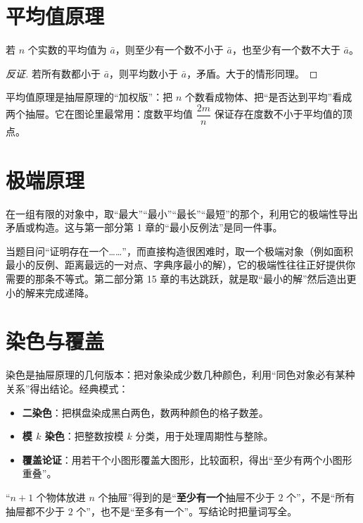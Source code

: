 \section{平均值原理}
\begin{theorem}[平均值原理]
若 $n$ 个实数的平均值为 $\bar a$，则至少有一个数不小于 $\bar a$，也至少有一个数不大于 $\bar a$。
\end{theorem}
\begin{proof}[反证]
若所有数都小于 $\bar a$，则平均数小于 $\bar a$，矛盾。大于的情形同理。
\end{proof}
平均值原理是抽屉原理的“加权版”：把 $n$ 个数看成物体、把“是否达到平均”看成两个抽屉。它在图论里最常用：度数平均值 $\dfrac{2m}{n}$ 保证存在度数不小于平均值的顶点。

\section{极端原理}
\begin{theorem}[极端原理]
在一组有限的对象中，取“最大”“最小”“最长”“最短”的那个，利用它的极端性导出矛盾或构造。这与第一部分第 1 章的“最小反例法”是同一件事。
\end{theorem}

\begin{tip}[什么时候用极端原理]
当题目问“证明存在一个……”，而直接构造很困难时，取一个极端对象（例如面积最小的反例、距离最远的一对点、字典序最小的解），它的极端性往往正好提供你需要的那条不等式。第二部分第 15 章的韦达跳跃，就是取“最小的解”然后造出更小的解来完成递降。
\end{tip}

\section{染色与覆盖}
染色是抽屉原理的几何版本：把对象染成少数几种颜色，利用“同色对象必有某种关系”得出结论。经典模式：
\begin{itemize}
\item \textbf{二染色}：把棋盘染成黑白两色，数两种颜色的格子数差。
\item \textbf{模 $k$ 染色}：把整数按模 $k$ 分类，用于处理周期性与整除。
\item \textbf{覆盖论证}：用若干个小图形覆盖大图形，比较面积，得出“至少有两个小图形重叠”。
\end{itemize}

\begin{pitfall}[“至少”与“至多”别写反]
“$n+1$ 个物体放进 $n$ 个抽屉”得到的是“\textbf{至少有一个}抽屉不少于 $2$ 个”，不是“所有抽屉都不少于 $2$ 个”，也不是“至多有一个”。写结论时把量词写全。
\end{pitfall}

